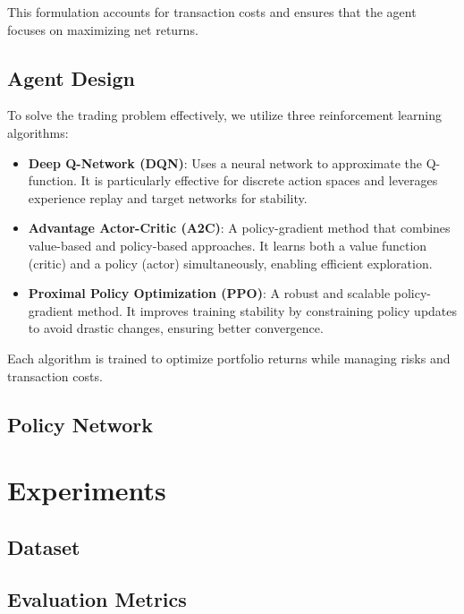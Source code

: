 \documentclass[conference]{IEEEtran}
\begin{document}
This formulation accounts for transaction costs and ensures that the agent focuses on maximizing net returns.

\subsection{Agent Design}

To solve the trading problem effectively, we utilize three reinforcement learning algorithms:

\begin{itemize}
    \item \textbf{Deep Q-Network (DQN)}: Uses a neural network to approximate the Q-function. It is particularly effective for discrete action spaces and leverages experience replay and target networks for stability.
    \item \textbf{Advantage Actor-Critic (A2C)}: A policy-gradient method that combines value-based and policy-based approaches. It learns both a value function (critic) and a policy (actor) simultaneously, enabling efficient exploration.
    \item \textbf{Proximal Policy Optimization (PPO)}: A robust and scalable policy-gradient method. It improves training stability by constraining policy updates to avoid drastic changes, ensuring better convergence.
\end{itemize}

Each algorithm is trained to optimize portfolio returns while managing risks and transaction costs.

\subsection{Policy Network}


\section{Experiments}

\subsection{Dataset}


\subsection{Evaluation Metrics}
\end{document}
